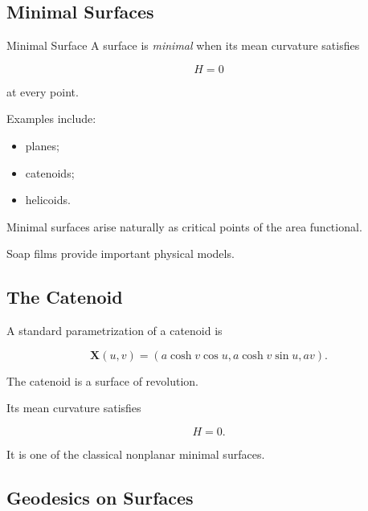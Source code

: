 \subsection{Minimal Surfaces}
\label{subsec:minimal-surfaces}

\begin{definitionbox}{Minimal Surface}
A surface is \emph{minimal} when its mean curvature satisfies

\[
\boxed{H=0}
\]

at every point.
\end{definitionbox}

Examples include:

\begin{itemize}
    \item planes;
    \item catenoids;
    \item helicoids.
\end{itemize}

Minimal surfaces arise naturally as critical points of the area functional.

Soap films provide important physical models.

\subsection{The Catenoid}
\label{subsec:catenoid}

A standard parametrization of a catenoid is

\[
\boxed{
\mathbf{X}(u,v)
=
\left(
a\cosh v\cos u,
a\cosh v\sin u,
av
\right).
}
\]

The catenoid is a surface of revolution.

Its mean curvature satisfies

\[
\boxed{H=0.}
\]

It is one of the classical nonplanar minimal surfaces.

\subsection{Geodesics on Surfaces}
\label{subsec:surface-geodesics}

